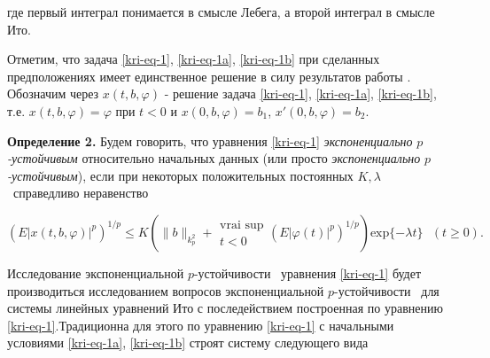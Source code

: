 где первый интеграл понимается в смысле Лебега, а второй интеграл в смысле Ито.

Отметим, что задача \eqref{kri-eq-1}, \eqref{kri-eq-1a}, \eqref{kri-eq-1b} при сделанных предположениях имеет единственное решение в силу результатов работы \cite{kri-bib-10}. Обозначим через $x(t,b,\varphi )$ - решение задача \eqref{kri-eq-1}, \eqref{kri-eq-1a}, \eqref{kri-eq-1b}, т.е. $x(t,b,\varphi)=\varphi$ при $t<0$ и $x(0,b,\varphi)=b_1$, $x'(0,b,\varphi)=b_2$.

\textbf{Определение 2.} Будем говорить, что уравнения \eqref{kri-eq-1} \textit{экспоненциально } $p$\textit{{}-устойчивым}
относительно начальных данных (или просто \textit{экспоненциально } $p$\textit{{}-устойчивым}), если при некоторых
положительных постоянных  $K,\lambda $ \ справедливо неравенство

\begin{equation*}
(E|x(t,b,\varphi )|^p)^{1/p}\le K\left(\|b\|_{k_p^2}+\begin{matrix}\text{vrai sup}\\t<0\end{matrix}(E|\varphi
(t)|^p)^{1/p}\right)\text{exp}\{-\mathit{\lambda t}\}\text{  }(t\ge 0).
\end{equation*}

Исследование экспоненциальной  $p${}-устойчивости \ уравнения \eqref{kri-eq-1} будет производиться исследованием вопросов
экспоненциальной  $p${}-устойчивости \ для системы линейных уравнений Ито с последействием построенная по уравнению
\eqref{kri-eq-1}.Традиционна для этого по уравнению \eqref{kri-eq-1} с начальными условиями \eqref{kri-eq-1a}, \eqref{kri-eq-1b} строят систему следующего вида

